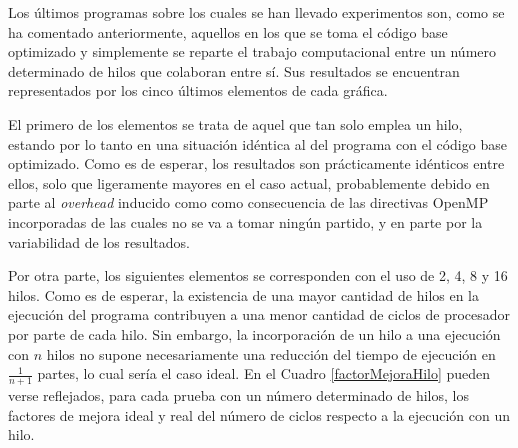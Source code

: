 \documentclass[conference]{IEEEtran}
\begin{document}
Los últimos programas sobre los cuales se han llevado experimentos son, como se ha comentado anteriormente, aquellos en los que se toma el código base optimizado y simplemente se reparte el trabajo computacional entre un número determinado de hilos que colaboran entre sí. Sus resultados se encuentran representados por los cinco últimos elementos de cada gráfica.

El primero de los elementos se trata de aquel que tan solo emplea un hilo, estando por lo tanto en una situación idéntica al del programa con el código base optimizado. Como es de esperar, los resultados son prácticamente idénticos entre ellos, solo que ligeramente mayores en el caso actual, probablemente debido en parte al \textit{overhead} inducido como como consecuencia de las directivas OpenMP incorporadas de las cuales no se va a tomar ningún partido, y en parte por la variabilidad de los resultados.

Por otra parte, los siguientes elementos se corresponden con el uso de 2, 4, 8 y 16 hilos. Como es de esperar, la existencia de una mayor cantidad de hilos en la ejecución del programa contribuyen a una menor cantidad de ciclos de procesador por parte de cada hilo. Sin embargo, la incorporación de un hilo a una ejecución con $n$ hilos no supone necesariamente una reducción del tiempo de ejecución en $\frac{1}{n+1}$ partes, lo cual sería el caso ideal. En el Cuadro \ref{factorMejoraHilo} pueden verse reflejados, para cada prueba con un número determinado de hilos, los factores de mejora ideal y real del número de ciclos respecto a la ejecución con un hilo.
\end{document}
